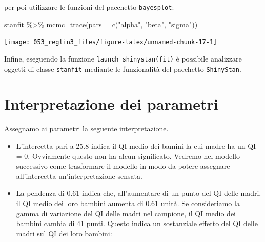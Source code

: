 \documentclass[
  10pt,
  italian,
  a4paper,
  extrafontsizes,onecolumn,openright
  ]{memoir}
\newenvironment{Shaded}{\begin{snugshade}}{\end{snugshade}}
\newcommand{\AttributeTok}[1]{\textcolor[rgb]{0.77,0.63,0.00}{#1}}
\newcommand{\FunctionTok}[1]{\textcolor[rgb]{0.00,0.00,0.00}{#1}}
\newcommand{\NormalTok}[1]{#1}
\newcommand{\OtherTok}[1]{\textcolor[rgb]{0.56,0.35,0.01}{#1}}
\newcommand{\SpecialCharTok}[1]{\textcolor[rgb]{0.00,0.00,0.00}{#1}}
\newcommand{\StringTok}[1]{\textcolor[rgb]{0.31,0.60,0.02}{#1}}
\providecommand{\tightlist}{%
  \setlength{\itemsep}{0pt}\setlength{\parskip}{0pt}}
\begin{document}
\begin{Shaded}
\end{Shaded}

\noindent
per poi utilizzare le funzioni del pacchetto \texttt{bayesplot}:

\begin{Shaded}
\begin{Highlighting}[]
\NormalTok{stanfit }\SpecialCharTok{\%\textgreater{}\%} 
  \FunctionTok{mcmc\_trace}\NormalTok{(}\AttributeTok{pars =} \FunctionTok{c}\NormalTok{(}\StringTok{"alpha"}\NormalTok{, }\StringTok{"beta"}\NormalTok{, }\StringTok{"sigma"}\NormalTok{))}
\end{Highlighting}
\end{Shaded}

\begin{center}\texttt{[image: 053\_reglin3\_files/figure-latex/unnamed-chunk-17-1]} \end{center}

Infine, eseguendo la funzione \texttt{launch\_shinystan(fit)} è possibile analizzare oggetti di classe \texttt{stanfit} mediante le funzionalità del pacchetto \texttt{ShinyStan}.

\hypertarget{interpretazione-dei-parametri}{%
\section{Interpretazione dei parametri}\label{interpretazione-dei-parametri}}

Assegnamo ai parametri la seguente interpretazione.

\begin{itemize}
\tightlist
\item
  L'intercetta pari a 25.8 indica il QI medio dei bamini la cui madre ha un QI = 0. Ovviamente questo non ha alcun significato. Vedremo nel modello successivo come trasformare il modello in modo da potere assegnare all'intercetta un'interpretazione sensata.
\item
  La pendenza di 0.61 indica che, all'aumentare di un punto del QI delle madri, il QI medio dei loro bambini aumenta di 0.61 unità. Se consideriamo la gamma di variazione del QI delle madri nel campione, il QI medio dei bambini cambia di 41 punti. Questo indica un sostanziale effetto del QI delle madri sul QI dei loro bambini:
\end{itemize}
\end{document}
